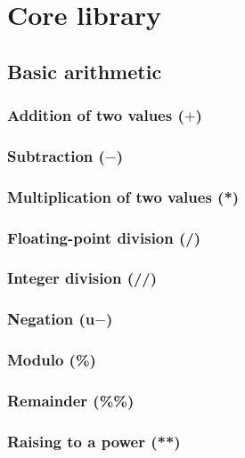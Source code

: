 \documentclass{article}
\theoremstyle{definition}
\begin{document}
\pagebreak

\section{Core library}

\subsection{Basic arithmetic}

\subsubsection{Addition of two values ($+$)}
\libfcn{+}

\subsubsection{Subtraction ($-$)}
\libfcn{-}

\subsubsection{Multiplication of two values (*)}
\libfcn{*}

\subsubsection{Floating-point division (/)}
\libfcn{/}

\subsubsection{Integer division (//)}
\libfcn{//}

\subsubsection{Negation (u$-$)}

\subsubsection{Modulo (\%)}
\libfcn{\%}

\subsubsection{Remainder (\%\%)}
\libfcn{\%\%}

\subsubsection{Raising to a power (**)}
\libfcn{**}
\end{document}
